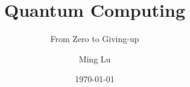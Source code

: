 \documentclass{beamer}
\title{Quantum Computing}
\subtitle{From Zero to Giving-up}
\author{Ming Lu}
\date{\today}
\begin{document}

\def\w{\ar@{-}[l]}
\def\W{\ar@{=}[l]}


\def\A#1{\save []="#1" \restore}


\def\op#1{*+[F]{\rule[-0.2ex]{0ex}{2.1ex}#1}}	%
\def\b{*={\bullet}}
\def\o{*={\oplus}}
\def\t{*={\times}}				%
\def\sq{*=<6pt,6pt>[F]{}}			%
\def\m#1{\left[\matrix{#1}\right]}		%
\def\z{*+[]{\rule[-0.2ex]{0ex}{2.1ex}~|0\>}}	%
\def\discard{*[]{\rule[-0.2ex]{0.75pt}{2.1ex}~}}	%
\def\slash{*={/}}				%


\def\N{*-{}\W}
\def\n{*-{}\w}


\def\>{\rangle}
\def\<{\langle}
\def\ua{\uparrow}

\def\meter{*+[]{\put(-3,0){\texttt{[image: meter.epsf]}}~~~~}%
		\ar@{-}[l]}


\def\q#1{*+{\rule[-0.2ex]{0ex}{2.1ex}|#1\>}}
\def\qv#1#2{*+{\rule[-0.2ex]{0ex}{2.1ex}|#1\>=|#2\>}}



\def\gspace#1{*+{\rule[-0.2ex]{0ex}{2.1ex}%
	\setbox\sbox=\hbox{$#1$}%
	\hspace*{\wd\sbox}}}

\def\gnqubit#1#2{\gspace{#1}
		 \save [].[#2]!C="qq"*[F]\frm{}\restore
		 \save "qq"*[]{#1} \restore}
\end{document}
